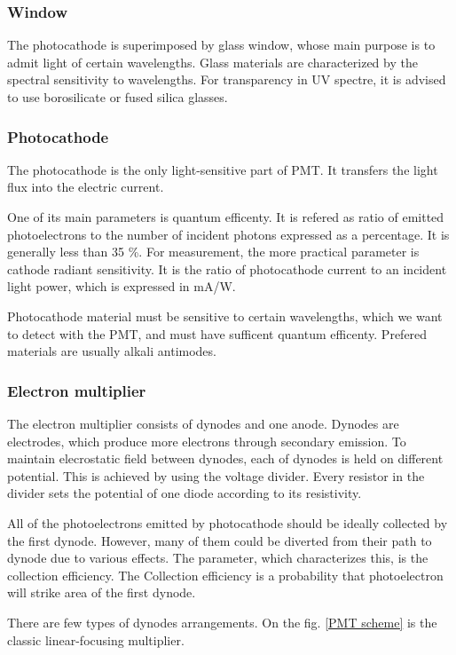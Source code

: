 \subsubsection{Window}

The photocathode is superimposed by glass window, whose main purpose is to admit light of certain wavelengths. Glass materials are characterized by the spectral sensitivity to wavelengths. For transparency in UV spectre, it is advised to use borosilicate or fused silica glasses.


\subsubsection{Photocathode}

The photocathode is the only light-sensitive part of PMT. It transfers the light flux into the electric current.
\par
One of its main parameters is quantum efficenty. It is refered as ratio of emitted photoelectrons to the number of incident photons expressed as a percentage. It is generally less than 35 \%. For measurement, the more practical parameter is cathode radiant sensitivity. It is the ratio of photocathode current to an incident light power, which is expressed in mA/W.
\par
Photocathode material must be sensitive to certain wavelengths, which we want to detect with the PMT, and must have sufficent quantum efficenty. Prefered materials are usually alkali antimodes.
\subsubsection{Electron multiplier}
The electron multiplier consists of dynodes and one anode.
Dynodes are electrodes, which produce more electrons through secondary emission. To maintain elecrostatic field between dynodes, each of dynodes is held on different potential. This is achieved by using the voltage divider. Every resistor in the divider sets the potential of one diode according to its resistivity.
\par
All of the photoelectrons emitted by photocathode should be ideally collected by the first dynode. However, many of them could be diverted from their path to dynode due to various effects. The parameter, which characterizes this, is the collection efficiency. The Collection efficiency is a probability that photoelectron will strike area of the first dynode. 
\par
There are few types of dynodes arrangements. On the fig. \ref{PMT scheme} is the classic linear-focusing multiplier. 


